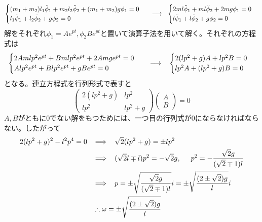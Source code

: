 \documentclass{jsarticle}
\begin{document}
\[\begin{cases}
(m_{1}+m_{2})l_{1}\ddot{\phi}_{1}+m_{2}l_{2}\ddot{\phi}_{2}+(m_{1}+m_{2})g\phi_{1}=0\\
l_{1}\ddot{\phi}_{1}+l_{2}\ddot{\phi}_{2}+g\phi_{2}=0\end{cases}\hspace{2mm}\longrightarrow\hspace{2mm}\begin{cases}
2ml\ddot{\phi}_{1}+ml\ddot{\phi}_{2}+2mg\phi_{1}=0\\
l\ddot{\phi}_{1}+l\ddot{\phi}_{2}+g\phi_{2}=0\end{cases}\]
解をそれぞれ\(\phi_{1}=Ae^{pt},\phi_{2}Be^{pt}\)と置いて演算子法を用いて解く。それぞれの方程式は
\[\begin{cases}
2Amlp^{2}e^{pt}+Bmlp^{2}e^{pt}+2Amge^{pt}=0\\
Alp^{2}e^{pt}+Blp^{2}e^{pt}+gBe^{pt}=0\end{cases}\hspace{3mm}\longrightarrow\hspace{3mm}\begin{cases}
2(lp^{2}+g)A+lp^{2}B=0\\
lp^{2}A+(lp^{2}+g)B=0\end{cases}\]
となる。連立方程式を行列形式で表すと
\[\left(\begin{array}{cc}
2(lp^{2}+g) & lp^{2}\\
lp^{2} & lp^{2}+g
\end{array}\right)\left(\begin{array}{c}
A\\
B
\end{array}\right)=0\]
\(A,B\)がともに0でない解をもつためには、一つ目の行列式が0にならなければならない。したがって
\begin{align*}
2(lp^{2}+g)^{2}-l^{2}p^{4}=0\hspace{3mm}&\Longrightarrow\hspace{3mm}\sqrt{2}(lp^{2}+g)=\pm lp^{2}\\
&\Longrightarrow\hspace{3mm}(\sqrt{2}l\mp l)p^{2}=-\sqrt{2}g,\hspace{5mm}p^{2}=-\frac{\sqrt{2}g}{(\sqrt{2}\mp1)l}\\
&\Longrightarrow\hspace{3mm}p=\pm\sqrt{\frac{\sqrt{2}g}{(\sqrt{2}\mp1)l}}i=\pm\sqrt{\frac{(2\pm\sqrt{2})g}{l}}i\\
&\therefore\omega=\pm\sqrt{\frac{(2\pm\sqrt{2})g}{l}}
\end{align*}
\end{document}
